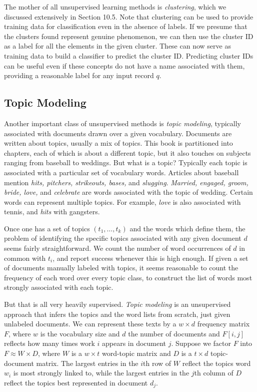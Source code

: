 \documentclass[10pt]{article}
\begin{document}
\begin{enumerate}
The mother of all unsupervised learning methods is \textit{clustering}, which we discussed extensively in Section 10.5. Note that clustering can be used to provide training data for classification even in the absence of labels. If we presume that the clusters found represent genuine phenomenon, we can then use the cluster ID as a label for all the elements in the given cluster. These can now serve as training data to build a classifier to predict the cluster ID. Predicting cluster IDs can be useful even if these concepts do not have a name associated with them, providing a reasonable label for any input record $q$.

\subsection{Topic Modeling}
Another important class of unsupervised methods is \textit{topic modeling}, typically associated with documents drawn over a given vocabulary. Documents are written about topics, usually a mix of topics. This book is partitioned into chapters, each of which is about a different topic, but it also touches on subjects ranging from baseball to weddings. But what is a topic? Typically each topic is associated with a particular set of vocabulary words. Articles about baseball mention \textit{hits, pitchers, strikeouts, bases,} and \textit{slugging}. \textit{Married, engaged, groom, bride, love,} and \textit{celebrate} are words associated with the topic of wedding. Certain words can represent multiple topics. For example, \textit{love} is also associated with tennis, and \textit{hits} with gangsters.

Once one has a set of topics $(t_{1}, \ldots, t_{k})$ and the words which define them, the problem of identifying the specific topics associated with any given document $d$ seems fairly straightforward. We count the number of word occurrences of $d$ in common with $t_{i}$, and report success whenever this is high enough. If given a set of documents manually labeled with topics, it seems reasonable to count the frequency of each word over every topic class, to construct the list of words most strongly associated with each topic.

But that is all very heavily supervised. \textit{Topic modeling} is an unsupervised approach that infers the topics and the word lists from scratch, just given unlabeled documents. We can represent these texts by a $w \times d$ frequency matrix $F$, where $w$ is the vocabulary size and $d$ the number of documents and $F[i, j]$ reflects how many times work $i$ appears in document $j$. Suppose we factor $F$ into $F \approx W \times D$, where $W$ is a $w \times t$ word-topic matrix and $D$ is a $t \times d$ topic-document matrix. The largest entries in the $i$th row of $W$ reflect the topics word $w_{i}$ is most strongly linked to, while the largest entries in the $j$th column of $D$ reflect the topics best represented in document $d_{j}$.


\end{enumerate}
\end{document}
